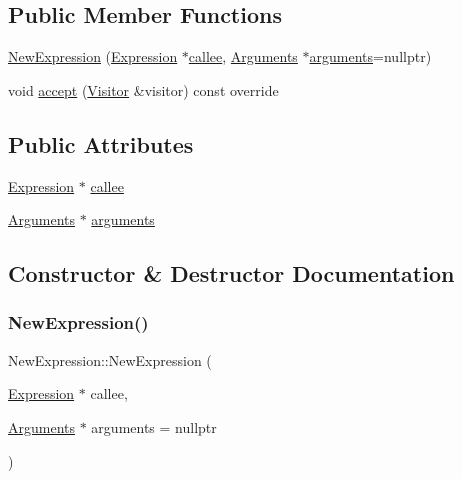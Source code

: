 \subsection*{Public Member Functions}
\begin{DoxyCompactItemize}
\item 
\hyperlink{struct_new_expression_a8a97ab4337fec49be339e232c1992fcb}{New\+Expression} (\hyperlink{struct_expression}{Expression} $\ast$\hyperlink{struct_new_expression_aa56c9b8daa3725a54fdb2b8fce63d237}{callee}, \hyperlink{struct_arguments}{Arguments} $\ast$\hyperlink{struct_new_expression_a4d43c4128966ccb728f92a0204d04eaa}{arguments}=nullptr)
\item 
void \hyperlink{struct_new_expression_a02f3b4798c1351cee31f27d0cbf6346f}{accept} (\hyperlink{struct_visitor}{Visitor} \&visitor) const override
\end{DoxyCompactItemize}
\subsection*{Public Attributes}
\begin{DoxyCompactItemize}
\item 
\hyperlink{struct_expression}{Expression} $\ast$ \hyperlink{struct_new_expression_aa56c9b8daa3725a54fdb2b8fce63d237}{callee}
\item 
\hyperlink{struct_arguments}{Arguments} $\ast$ \hyperlink{struct_new_expression_a4d43c4128966ccb728f92a0204d04eaa}{arguments}
\end{DoxyCompactItemize}


\subsection{Constructor \& Destructor Documentation}
\mbox{\label{struct_new_expression_a8a97ab4337fec49be339e232c1992fcb}} 
\subsubsection{\texorpdfstring{New\+Expression()}{NewExpression()}}
{\footnotesize\ttfamily New\+Expression\+::\+New\+Expression (\begin{DoxyParamCaption}\item[{\hyperlink{struct_expression}{Expression} $\ast$}]{callee,  }\item[{\hyperlink{struct_arguments}{Arguments} $\ast$}]{arguments = {\ttfamily nullptr} }\end{DoxyParamCaption})\hspace{0.3cm}{\ttfamily [inline]}}



